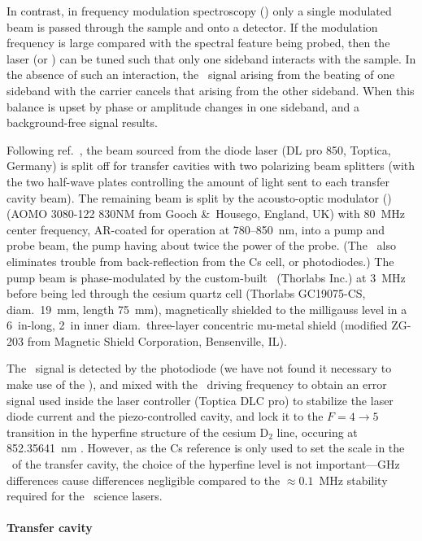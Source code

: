 In contrast, in frequency modulation spectroscopy (\FMS) only a single modulated
beam is passed through the sample and onto a detector. If the modulation
frequency is large compared with the spectral feature being probed, then the
laser (or \EOM) can be tuned such that only one sideband interacts with the
sample. In the absence of such an interaction, the \RF\ signal arising from the
beating of one sideband with the carrier cancels that arising from the other
sideband. When this balance is upset by phase or amplitude changes in one
sideband, and a background-free signal results. \cite{bjorklund1980frequency}

Following ref.~\cite{zi2017laser}, the beam sourced from the diode laser (DL pro
850, Toptica, Germany) is split off for transfer cavities with two polarizing
beam splitters (with the two half-wave plates controlling the amount of light
sent to each transfer cavity beam). The remaining beam is split by the
acousto-optic modulator (\AOM) (AOMO 3080-122 830NM from Gooch \&\ Housego,
England, UK) with 80~MHz center frequency, AR-coated for operation at
780--850~nm, into a pump and probe beam, the pump having about twice the power
of the probe. (The \AOM\ also eliminates trouble from back-reflection from the Cs
cell, or photodiodes.) The pump beam is phase-modulated by the custom-built
\EOM\ (Thorlabs Inc.) at 3~MHz before being led through the cesium quartz cell
(Thorlabs GC19075-CS, diam.\ 19~mm, length 75~mm), magnetically shielded to the
milligauss level in a 6~in-long, 2~in inner diam.\ three-layer concentric
mu-metal shield (modified ZG-203 from Magnetic Shield Corporation, Bensenville,
IL). 

The \MTS\ signal is detected by the photodiode (we have not found it necessary
to make use of the \FMS), and mixed with the \EOM\ driving frequency to obtain
an error signal used inside the laser controller (Toptica DLC pro) to stabilize
the laser diode current and the piezo-controlled cavity, and lock it to the
$F=4\to5$ transition in the hyperfine structure of the cesium D$_2$ line,
occuring at 852.35641~nm \cite{steck2003cesium}. However, as the Cs reference is
only used to set the scale in the \FSR\ of the transfer cavity, the choice of
the hyperfine level is not important---GHz differences cause differences
negligible compared to the $\approx0.1$~MHz stability required for the \IR\
science lasers.

\paragraph{Transfer cavity}
\label{transfer_cavity}


